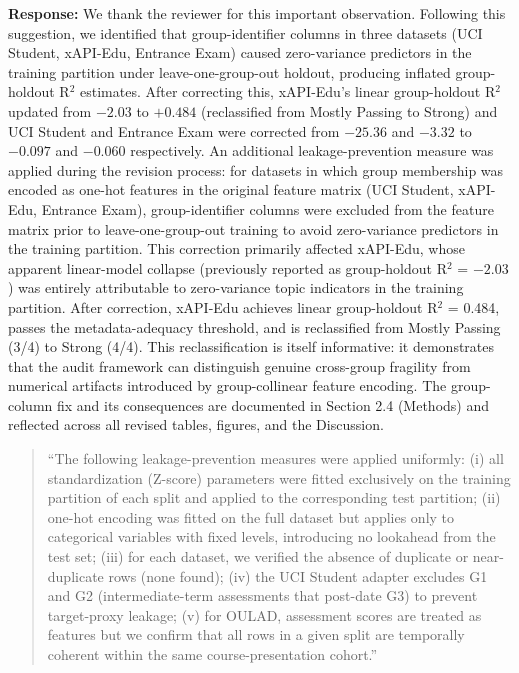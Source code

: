 \documentclass[12pt,a4paper]{article}
\begin{document}
\textbf{Response:} We thank the reviewer for this important observation. Following this suggestion, we identified that group-identifier columns in three datasets (UCI Student, xAPI-Edu, Entrance Exam) caused zero-variance predictors in the training partition under leave-one-group-out holdout, producing inflated group-holdout R$^2$ estimates. After correcting this, xAPI-Edu's linear group-holdout R$^2$ updated from $-2.03$ to $+0.484$ (reclassified from Mostly Passing to Strong) and UCI Student and Entrance Exam were corrected from $-25.36$ and $-3.32$ to $-0.097$ and $-0.060$ respectively. An additional leakage-prevention measure was applied during the revision process: for datasets in which group membership was encoded as one-hot features in the original feature matrix (UCI Student, xAPI-Edu, Entrance Exam), group-identifier columns were excluded from the feature matrix prior to leave-one-group-out training to avoid zero-variance predictors in the training partition. This correction primarily affected xAPI-Edu, whose apparent linear-model collapse (previously reported as group-holdout R$^2$ = $-2.03$) was entirely attributable to zero-variance topic indicators in the training partition. After correction, xAPI-Edu achieves linear group-holdout R$^2$ = 0.484, passes the metadata-adequacy threshold, and is reclassified from Mostly Passing (3/4) to Strong (4/4). This reclassification is itself informative: it demonstrates that the audit framework can distinguish genuine cross-group fragility from numerical artifacts introduced by group-collinear feature encoding. The group-column fix and its consequences are documented in Section 2.4 (Methods) and reflected across all revised tables, figures, and the Discussion.

\begin{quote}
``The following leakage-prevention measures were applied uniformly: (i) all standardization (Z-score) parameters were fitted exclusively on the training partition of each split and applied to the corresponding test partition; (ii) one-hot encoding was fitted on the full dataset but applies only to categorical variables with fixed levels, introducing no lookahead from the test set; (iii) for each dataset, we verified the absence of duplicate or near-duplicate rows (none found); (iv) the UCI Student adapter excludes G1 and G2 (intermediate-term assessments that post-date G3) to prevent target-proxy leakage; (v) for OULAD, assessment scores are treated as features but we confirm that all rows in a given split are temporally coherent within the same course-presentation cohort.''
\end{quote}
\end{document}
